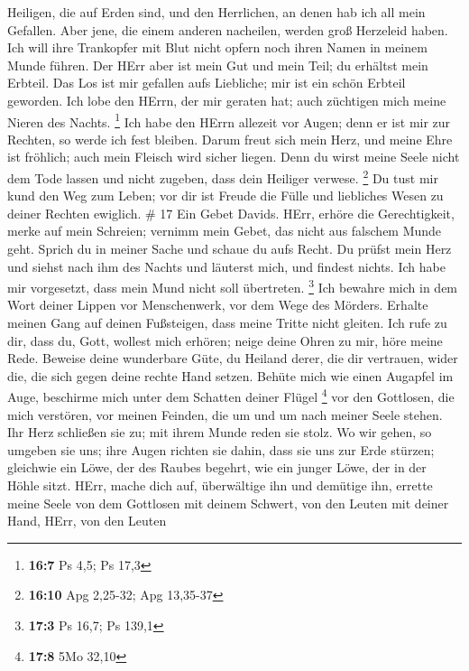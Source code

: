 Heiligen, die auf Erden sind, und den Herrlichen, an denen hab ich all
mein Gefallen.  Aber jene, die einem anderen nacheilen,
werden groß Herzeleid haben. Ich will ihre Trankopfer mit Blut nicht
opfern noch ihren Namen in meinem Munde führen.  Der HErr
aber ist mein Gut und mein Teil; du erhältst mein Erbteil. 
Das Los ist mir gefallen aufs Liebliche; mir ist ein schön Erbteil
geworden.  Ich lobe den HErrn, der mir geraten hat; auch
züchtigen mich meine Nieren des Nachts. \footnote{\textbf{16:7} Ps 4,5;
  Ps 17,3}  Ich habe den HErrn allezeit vor Augen; denn er
ist mir zur Rechten, so werde ich fest bleiben.  Darum freut
sich mein Herz, und meine Ehre ist fröhlich; auch mein Fleisch wird
sicher liegen.  Denn du wirst meine Seele nicht dem Tode
lassen und nicht zugeben, dass dein Heiliger verwese. \footnote{\textbf{16:10}
  Apg 2,25-32; Apg 13,35-37}  Du tust mir kund den Weg zum
Leben; vor dir ist Freude die Fülle und liebliches Wesen zu deiner
Rechten ewiglich. \# 17  Ein Gebet Davids. HErr, erhöre die
Gerechtigkeit, merke auf mein Schreien; vernimm mein Gebet, das nicht
aus falschem Munde geht.  Sprich du in meiner Sache und
schaue du aufs Recht.  Du prüfst mein Herz und siehst nach
ihm des Nachts und läuterst mich, und findest nichts. Ich habe mir
vorgesetzt, dass mein Mund nicht soll übertreten. \footnote{\textbf{17:3}
  Ps 16,7; Ps 139,1}  Ich bewahre mich in dem Wort deiner
Lippen vor Menschenwerk, vor dem Wege des Mörders.  Erhalte
meinen Gang auf deinen Fußsteigen, dass meine Tritte nicht gleiten.
 Ich rufe zu dir, dass du, Gott, wollest mich erhören; neige
deine Ohren zu mir, höre meine Rede.  Beweise deine
wunderbare Güte, du Heiland derer, die dir vertrauen, wider die, die
sich gegen deine rechte Hand setzen.  Behüte mich wie einen
Augapfel im Auge, beschirme mich unter dem Schatten deiner Flügel
\footnote{\textbf{17:8} 5Mo 32,10}  vor den Gottlosen, die
mich verstören, vor meinen Feinden, die um und um nach meiner Seele
stehen.  Ihr Herz schließen sie zu; mit ihrem Munde reden
sie stolz.  Wo wir gehen, so umgeben sie uns; ihre Augen
richten sie dahin, dass sie uns zur Erde stürzen; 
gleichwie ein Löwe, der des Raubes begehrt, wie ein junger Löwe, der in
der Höhle sitzt.  HErr, mache dich auf, überwältige ihn und
demütige ihn, errette meine Seele von dem Gottlosen mit deinem Schwert,
 von den Leuten mit deiner Hand, HErr, von den Leuten
